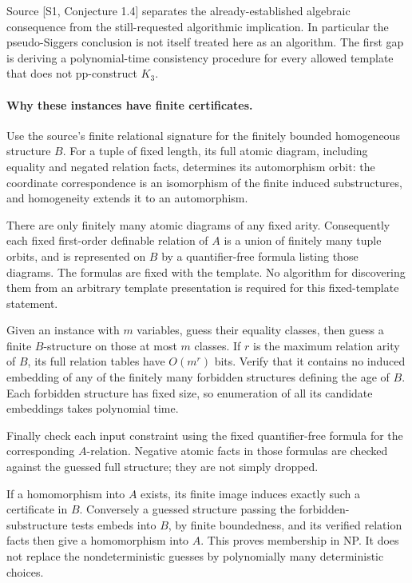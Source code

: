 \documentclass[11pt]{article}
\begin{document}
Source [S1, Conjecture 1.4] separates the already-established algebraic consequence from the still-requested algorithmic implication. In particular the pseudo-Siggers conclusion is not itself treated here as an algorithm. The first gap is deriving a polynomial-time consistency procedure for every allowed template that does not pp-construct $K_3$.

\paragraph{Why these instances have finite certificates.}
Use the source's finite relational signature for the finitely bounded homogeneous structure $B$. For a tuple of fixed length, its full atomic diagram, including equality and negated relation facts, determines its automorphism orbit: the coordinate correspondence is an isomorphism of the finite induced substructures, and homogeneity extends it to an automorphism.

There are only finitely many atomic diagrams of any fixed arity. Consequently each fixed first-order definable relation of $A$ is a union of finitely many tuple orbits, and is represented on $B$ by a quantifier-free formula listing those diagrams. The formulas are fixed with the template. No algorithm for discovering them from an arbitrary template presentation is required for this fixed-template statement.

Given an instance with $m$ variables, guess their equality classes, then guess a finite $B$-structure on those at most $m$ classes. If $r$ is the maximum relation arity of $B$, its full relation tables have $O(m^r)$ bits. Verify that it contains no induced embedding of any of the finitely many forbidden structures defining the age of $B$. Each forbidden structure has fixed size, so enumeration of all its candidate embeddings takes polynomial time.

Finally check each input constraint using the fixed quantifier-free formula for the corresponding $A$-relation. Negative atomic facts in those formulas are checked against the guessed full structure; they are not simply dropped.

If a homomorphism into $A$ exists, its finite image induces exactly such a certificate in $B$. Conversely a guessed structure passing the forbidden-substructure tests embeds into $B$, by finite boundedness, and its verified relation facts then give a homomorphism into $A$. This proves membership in NP. It does not replace the nondeterministic guesses by polynomially many deterministic choices.
\end{document}
